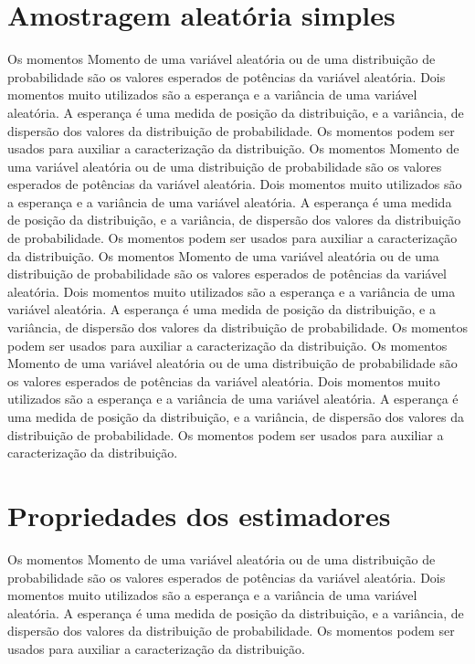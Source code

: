 \documentclass[12pt]{article}
\begin{document}
\section{Amostragem aleatória simples}
Os momentos Momento de uma variável aleatória ou de uma distribuição de probabilidade são os valores esperados de potências da variável aleatória. Dois momentos muito utilizados são a esperança e a variância de uma variável aleatória. A esperança é uma medida de posição da distribuição, e a variância, de dispersão dos valores da distribuição de probabilidade. Os momentos podem ser usados para auxiliar a caracterização da distribuição.
Os momentos Momento de uma variável aleatória ou de uma distribuição de probabilidade são os valores esperados de potências da variável aleatória. Dois momentos muito utilizados são a esperança e a variância de uma variável aleatória. A esperança é uma medida de posição da distribuição, e a variância, de dispersão dos valores da distribuição de probabilidade. Os momentos podem ser usados para auxiliar a caracterização da distribuição.
Os momentos Momento de uma variável aleatória ou de uma distribuição de probabilidade são os valores esperados de potências da variável aleatória. Dois momentos muito utilizados são a esperança e a variância de uma variável aleatória. A esperança é uma medida de posição da distribuição, e a variância, de dispersão dos valores da distribuição de probabilidade. Os momentos podem ser usados para auxiliar a caracterização da distribuição.
Os momentos Momento de uma variável aleatória ou de uma distribuição de probabilidade são os valores esperados de potências da variável aleatória. Dois momentos muito utilizados são a esperança e a variância de uma variável aleatória. A esperança é uma medida de posição da distribuição, e a variância, de dispersão dos valores da distribuição de probabilidade. Os momentos podem ser usados para auxiliar a caracterização da distribuição.

\section{Propriedades dos estimadores}
Os momentos Momento de uma variável aleatória ou de uma distribuição de probabilidade são os valores esperados de potências da variável aleatória. Dois momentos muito utilizados são a esperança e a variância de uma variável aleatória. A esperança é uma medida de posição da distribuição, e a variância, de dispersão dos valores da distribuição de probabilidade. Os momentos podem ser usados para auxiliar a caracterização da distribuição.
\end{document}
